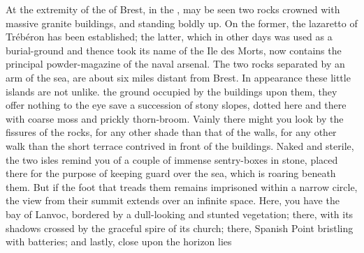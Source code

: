 \documentclass[paper=A5]{scrbook}
\begin{document}
\beginnumbering\pstart
At the extremity of the  of Brest, in the , may be seen two rocks crowned with massive granite buildings, and standing boldly up. On the former, the lazaretto of Trébéron has been established; the latter, which in other days was used as a burial-ground and thence took its name of the Ile des Morts, now contains the principal powder-magazine of the naval arsenal. The two rocks separated by an arm of the sea, are about six miles distant from Brest. In appearance these little islands are not unlike.  the ground occupied by the buildings upon them, they offer nothing to the eye save a succession of stony slopes, dotted here and there with coarse moss and prickly thorn-broom. Vainly there might you look  by the fissures of the rocks, for any other shade than that of the walls, for any other walk than the short terrace contrived in front of the buildings. Naked and sterile, the two isles remind you of a couple of immense sentry-boxes in stone, placed there for the purpose of keeping guard over the sea, which is roaring beneath them. But if the foot that treads them remains imprisoned within a narrow circle, the view from their summit extends over an infinite space. Here, you have the bay of Lanvoc, bordered by a dull-looking and stunted vegetation; there,  with its shadows crossed by the graceful spire of its church; there, Spanish Point bristling with batteries; and lastly, close upon the horizon lies 
\pend\endnumbering
\newpage
{}
\end{document}
